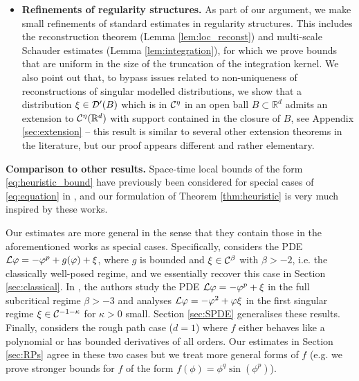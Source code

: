 \documentclass[11pt,a4paper]{article}
\numberwithin{equation}{section}
\theoremstyle{definition}
\theoremstyle{remark}
\def\R{{\mathbb R}}
\begin{document}
\begin{itemize}
  \item \textbf{Refinements of regularity structures.}
  As part of our argument, we make small refinements of standard estimates in regularity structures.
  This includes the reconstruction theorem (Lemma \ref{lem:loc_reconst}) and multi-scale Schauder estimates (Lemma \ref{lem:integration}),
  for which we prove bounds that are uniform in the size of the truncation of the integration kernel.
  We also point out that, to bypass issues related to non-uniqueness of reconstructions of singular modelled distributions,
  we show that a distribution $\xi\in\mathcal{D}'(B)$ which is in $\mathcal{C}^\eta$ in an open ball $B\subset \R^d$
  admits an extension to $\CC^\eta(\R^d)$ with support contained in the closure of $B$, see Appendix \ref{sec:extension} --
  this result is similar to several other extension theorems in the literature, but our proof appears different and rather elementary.
\end{itemize}


\textbf{Comparison to other results.}
Space-time local bounds of the form \eqref{eq:heuristic_bound} have previously been considered for special cases of \eqref{eq:equation} in \cite{MW20_reaction,MoinatWeber20,CMW23,BCMW22,Jin_Perkowski_25},
and our formulation of Theorem \ref{thm:heuristic} is very much inspired by these works.

Our estimates are more general in the sense that they contain those in the aforementioned works as special cases.
Specifically, \cite{MW20_reaction} considers the PDE $\mathcal{L}\varphi = -\varphi^p + g(\varphi) + \xi$, where $g$ is bounded and $\xi\in\mathcal{C}^\beta$ with $\beta>-2$, i.e. the classically well-posed regime,
and we essentially recover this case in Section \ref{sec:classical}.
In \cite{MoinatWeber20,CMW23}, the authors study the PDE $\mathcal{L}\varphi = -\varphi^p +\xi$ in the full subcritical regime $\beta>-3$ and \cite{Jin_Perkowski_25} analyses $\mathcal{L}\varphi = -\varphi^2 + \varphi\xi$ in the first singular regime $\xi \in \mathcal{C}^{-1-\kappa}$ for $\kappa>0$ small.
Section \ref{sec:SPDE} generalises these results.
Finally, \cite{BCMW22} considers the rough path case ($d=1$) where $f$ either behaves like a polynomial or has bounded derivatives of all orders. Our estimates in Section \ref{sec:RPs} agree in these two cases but we treat more general forms of $f$ (e.g. we prove stronger bounds for $f$ of the form $f(\phi)=\phi^q\sin(\phi^p)$).
\end{document}
